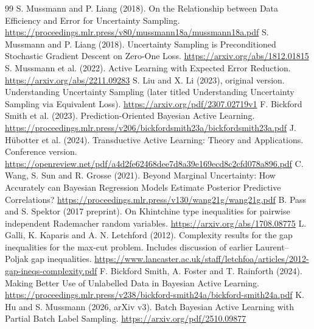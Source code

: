 \documentclass[11pt]{article}
\theoremstyle{definition}
\newcommand{\1}{\mathbf 1}
\begin{document}
\begin{thebibliography}{99}
 S. Mussmann and P. Liang (2018).
On the Relationship between Data Efficiency and Error for Uncertainty Sampling.
\url{https://proceedings.mlr.press/v80/mussmann18a/mussmann18a.pdf}
 S. Mussmann and P. Liang (2018).
Uncertainty Sampling is Preconditioned Stochastic Gradient Descent on Zero-One Loss.
\url{https://arxiv.org/abs/1812.01815}
 S. Mussmann et al. (2022).
Active Learning with Expected Error Reduction.
\url{https://arxiv.org/abs/2211.09283}
 S. Liu and X. Li (2023), original version.
Understanding Uncertainty Sampling (later titled Understanding Uncertainty
Sampling via Equivalent Loss).
\url{https://arxiv.org/pdf/2307.02719v1}
 F. Bickford Smith et al. (2023).
Prediction-Oriented Bayesian Active Learning.
\url{https://proceedings.mlr.press/v206/bickfordsmith23a/bickfordsmith23a.pdf}
 J. H\"ubotter et al. (2024). Transductive Active Learning:
Theory and Applications. Conference version.
\url{https://openreview.net/pdf/a4d2fe62468dee7d8a39e169ecd8c2cfd078a896.pdf}
 C. Wang, S. Sun and R. Grosse (2021).
Beyond Marginal Uncertainty: How Accurately can Bayesian Regression Models
Estimate Posterior Predictive Correlations?
\url{https://proceedings.mlr.press/v130/wang21g/wang21g.pdf}
 B. Pass and S. Spektor (2017 preprint).
On Khintchine type inequalities for pairwise independent Rademacher random variables.
\url{https://arxiv.org/abs/1708.08775}
 L. Galli, K. Kaparis and A. N. Letchford (2012).
Complexity results for the gap inequalities for the max-cut problem.
Includes discussion of earlier Laurent--Poljak gap inequalities.
\url{https://www.lancaster.ac.uk/staff/letchfoa/articles/2012-gap-ineqs-complexity.pdf}
 F. Bickford Smith, A. Foster and T. Rainforth (2024).
Making Better Use of Unlabelled Data in Bayesian Active Learning.
\url{https://proceedings.mlr.press/v238/bickford-smith24a/bickford-smith24a.pdf}
 K. Hu and S. Mussmann (2026, arXiv v3).
Batch Bayesian Active Learning with Partial Batch Label Sampling.
\url{https://arxiv.org/pdf/2510.09877}
\end{thebibliography}
\end{document}
